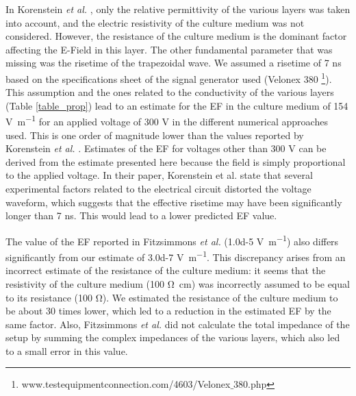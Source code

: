 In Korenstein \textit{et al.} \cite{Korenstein1984-qb}, only the relative permittivity of the various layers was taken into account, and the electric resistivity of the culture medium was not considered. However, the resistance of the culture medium is the dominant factor affecting the E-Field in this layer. The other fundamental parameter that was missing was the risetime of the trapezoidal wave. We assumed a risetime of 7 \si{\nano\second} based on the specifications sheet of the signal generator used (Velonex 380 \footnote{www.testequipmentconnection.com/4603/Velonex$\_$380.php}). This assumption and the ones related to the conductivity of the various layers (Table \ref{table_prop}) lead to an estimate for the \acs{EF} in the culture medium of 154 \si{\volt\per\meter} for an applied voltage of 300 \si{\volt} in the different numerical approaches used. This is one order of magnitude lower than the values reported by Korenstein \textit{et al.} \cite{Korenstein1984-qb}. Estimates of the \acs{EF} for voltages other than 300 \si{\volt} can be derived from the estimate presented here because the field is simply proportional to the applied voltage. In their paper, Korenstein et al. state that several experimental factors related to the electrical circuit distorted the voltage waveform, which suggests that the effective risetime may have been significantly longer than 7 \si{\nano\second}. This would lead to a lower predicted \acs{EF} value.  

The value of the \acs{EF} reported in Fitzsimmons \textit{et al.} (\num{1.0d-5} \si{\volt\per\meter}) \cite{Fitzsimmons1986-ks} also differs significantly from our estimate of \num{3.0d-7} \si{\volt\per\meter}. This discrepancy arises from an incorrect estimate of the resistance of the culture medium: it seems that the resistivity of the culture medium (100 \si{\ohm\centi\meter}) was incorrectly assumed to be equal to its resistance (100 \si{\ohm}). We estimated the resistance of the culture medium to be about 30 times lower, which led to a reduction in the estimated \acs{EF} by the same factor. Also, Fitzsimmons \textit{et al.} did not calculate the total impedance of the setup by summing the complex impedances of the various layers, which also led to a small error in this value.

